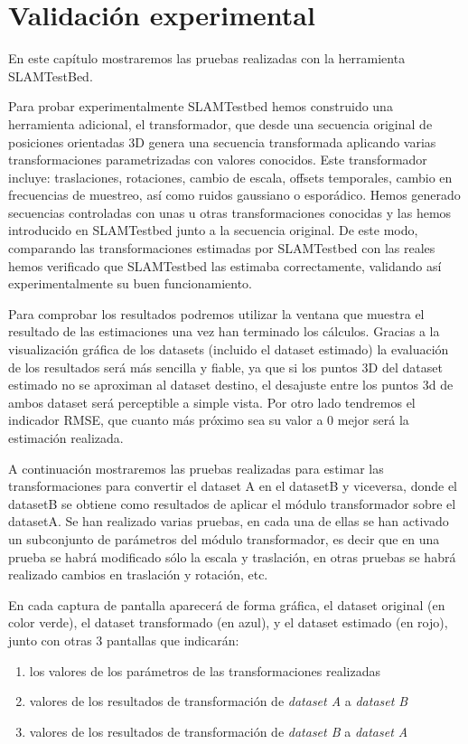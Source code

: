 \newpage
\chapter{Validación experimental} \label{cap:experimentos}
En este capítulo mostraremos las pruebas realizadas con la herramienta SLAMTestBed.

Para probar experimentalmente SLAMTestbed hemos construido una herramienta adicional, el transformador, que desde una secuencia original de posiciones orientadas 3D genera una secuencia transformada aplicando varias transformaciones parametrizadas con valores conocidos. Este transformador incluye: traslaciones, rotaciones, cambio de escala, offsets temporales, cambio en frecuencias de muestreo, así como ruidos gaussiano o esporádico.
Hemos generado secuencias controladas con unas u otras transformaciones conocidas y las hemos introducido en SLAMTestbed junto a la secuencia original. De este modo, comparando las transformaciones estimadas por SLAMTestbed con las reales hemos verificado que SLAMTestbed las estimaba correctamente, validando así experimentalmente su buen funcionamiento.

Para comprobar los resultados podremos utilizar la ventana que muestra el resultado de las estimaciones una vez han terminado los cálculos. Gracias a la visualización gráfica de los datasets (incluido el dataset estimado) la evaluación de los resultados será más sencilla y fiable, ya que si los puntos 3D del dataset estimado no se aproximan al dataset destino, el desajuste entre los puntos 3d de ambos dataset será perceptible a simple vista. 
Por otro lado tendremos el indicador RMSE, que cuanto más próximo sea su valor a 0 mejor será la estimación realizada.

A continuación mostraremos las pruebas realizadas para estimar las transformaciones para convertir el dataset A en el datasetB y viceversa, donde el datasetB se obtiene como resultados de aplicar el módulo transformador sobre el datasetA.
Se han realizado varias pruebas, en cada una de ellas se han activado un subconjunto de parámetros del módulo transformador, es decir que en una prueba se habrá modificado sólo la escala y traslación, en otras pruebas se habrá realizado cambios en traslación y rotación, etc.

En cada captura de pantalla aparecerá de forma gráfica, el dataset original (en color verde), el dataset transformado (en azul), y el dataset estimado (en rojo), junto con otras 3 pantallas que indicarán:
\begin{enumerate}
 \item{los valores de los parámetros de las transformaciones realizadas} 
 \item{valores de los resultados de transformación de \textit{dataset A} a \textit{dataset B}}
 \item{valores de los resultados de transformación de \textit{dataset B} a \textit{dataset A}}
\end{enumerate}

